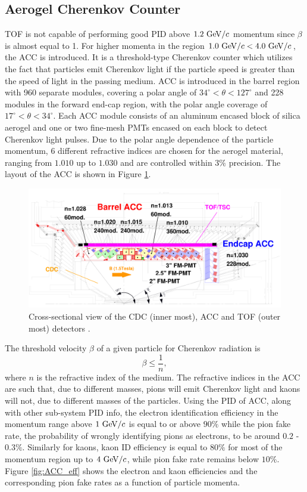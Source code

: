 \subsection{Aerogel Cherenkov Counter}
TOF is not capable of performing good PID above $1.2\mathrm{~GeV}/c$ momentum since $\beta$ is almost equal to 1. For higher momenta in the region $1.0\mathrm{~GeV}/c < 4.0\mathrm{~GeV}/c$, the ACC is introduced. It is a threshold-type Cherenkov counter which utilizes the fact that particles emit Cherenkov light if the particle speed is greater than the speed of light in the passing medium. ACC is introduced in the barrel region with 960 separate modules, covering a polar angle of $34^\circ < \theta < 127^\circ$ and 228 modules in the forward end-cap region, with the polar angle coverage of $17^\circ < \theta < 34^\circ$. Each ACC module consists of an aluminum encased block of silica aerogel and one or two fine-mesh PMTs encased on each block to detect Cherenkov light pulses. Due to the polar angle dependence of the particle momentum, 6 different refractive indices are chosen for the aerogel material, ranging from $1.010$ up to $1.030$ and are controlled within $3\%$ precision. The layout of the ACC is shown in Figure \ref{fig:ACC_layout}.
\begin{figure}[H]
	\centering
	\captionsetup{width=0.8\linewidth}
	\includegraphics[width=\linewidth]{fig/setup/ACC_layout}
	\caption{Cross-sectional view of the CDC (inner most), ACC and TOF (outer most) detectors \cite{ABASHIAN2002117}.}
	\label{fig:ACC_layout}
\end{figure}
The threshold velocity $\beta$ of a given particle for Cherenkov radiation is
\begin{equation}
\beta \leq \frac{1}{n},
\end{equation}
where $n$ is the refractive index of the medium. The refractive indices in the ACC are such that, due to different masses, pions will emit Cherenkov light and kaons will not, due to different masses of the particles. Using the PID of ACC, along with other sub-system PID info, the electron identification efficiency in the momentum range above $1\mathrm{~GeV}/c$ is equal to or above $90\%$ while the pion fake rate, the probability of wrongly identifying pions as electrons, to be around $0.2$ - $0.3\%$. Similarly for kaons, kaon ID efficiency is equal to $80\%$ for most of the momentum region up to $4\mathrm{~GeV}/c$, while pion fake rate remains below $10\%$. Figure \ref{fig:ACC_eff} shows the electron and kaon efficiencies and the corresponding pion fake rates as a function of particle momenta.

